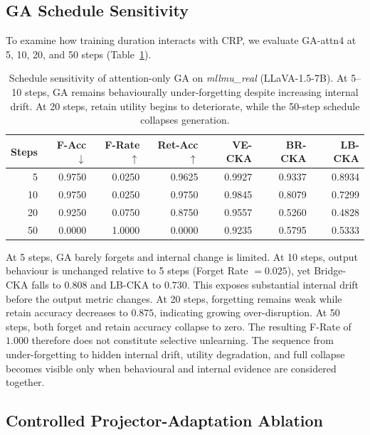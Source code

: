 \documentclass[letterpaper]{article}
\begin{document}
\subsection{GA Schedule Sensitivity}

To examine how training duration interacts with CRP, we evaluate GA-attn4 at
5, 10, 20, and 50 steps (Table~\ref{tab:schedule}).

\begin{table}[t]
\centering
\caption{Schedule sensitivity of attention-only GA on \emph{mllmu\_real}
(LLaVA-1.5-7B). At 5--10 steps, GA remains behaviourally
under-forgetting despite increasing internal drift. At 20 steps, retain
utility begins to deteriorate, while the 50-step schedule collapses
generation.}
\label{tab:schedule}
\setlength{\tabcolsep}{3pt}
\small
\begin{tabular}{rrrrrrr}
\toprule
\textbf{Steps} & \textbf{F-Acc}$\downarrow$ & \textbf{F-Rate}$\uparrow$
& \textbf{Ret-Acc}$\uparrow$ & \textbf{VE-CKA} & \textbf{BR-CKA}
& \textbf{LB-CKA} \\
\midrule
 5 & 0.9750 & 0.0250 & 0.9625 & 0.9927 & 0.9337 & 0.8934 \\
10 & 0.9750 & 0.0250 & 0.9750 & 0.9845 & 0.8079 & 0.7299 \\
20 & 0.9250 & 0.0750 & 0.8750 & 0.9557 & 0.5260 & 0.4828 \\
50 & 0.0000 & 1.0000 & 0.0000 & 0.9235 & 0.5795 & 0.5333 \\
\bottomrule
\end{tabular}
\end{table}

At 5 steps, GA barely forgets and internal change is limited. At 10 steps,
output behaviour is unchanged relative to 5 steps (Forget Rate $=0.025$),
yet Bridge-CKA falls to $0.808$ and LB-CKA to $0.730$. This exposes
substantial internal drift before the output metric changes. At 20 steps,
forgetting remains weak while retain accuracy decreases to $0.875$,
indicating growing over-disruption. At 50 steps, both forget and retain
accuracy collapse to zero. The resulting F-Rate of $1.000$ therefore does not constitute selective unlearning. The sequence from under-forgetting to hidden
internal drift, utility degradation, and full collapse becomes visible only
when behavioural and internal evidence are considered together.

\subsection{Controlled Projector-Adaptation Ablation}
\end{document}
